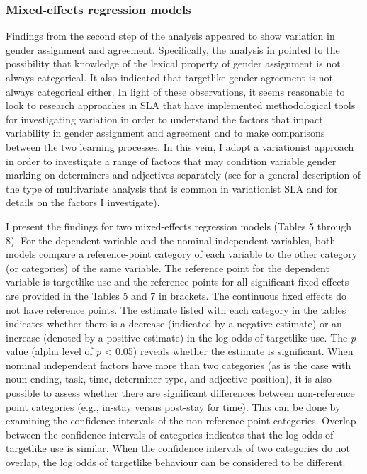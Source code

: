 \documentclass[output=paper,colorlinks,citecolor=brown,modfonts,nonflat]{../langscibook}
\begin{document}
\subsubsection{Mixed-effects regression models}\label{sec:gudmestad:3.2.3}

Findings from the second step of the analysis appeared to show variation in gender assignment and agreement. Specifically, the analysis in  pointed to the possibility that knowledge of the lexical property of gender assignment is not always categorical. It also indicated that targetlike gender agreement is not always categorical either. In light of these observations, it seems reasonable to look to research approaches in SLA that have implemented methodological tools for investigating variation in order to understand the factors that impact variability in gender assignment and agreement and to make comparisons between the two learning processes. In this vein, I adopt a variationist approach in order to investigate a range of factors that may condition variable gender marking on determiners and adjectives separately (see  for a general description of the type of multivariate analysis that is common in variationist SLA and for details on the factors I investigate). 



I present the findings for two mixed-effects regression models (Tables 5 through 8). For the dependent variable and the nominal independent variables, both models compare a reference-point category of each variable to the other category (or categories) of the same variable. The reference point for the dependent variable is targetlike use and the reference points for all significant fixed effects are provided in the Tables 5 and 7 in brackets. The continuous fixed effects do not have reference points. The estimate listed with each category in the tables indicates whether there is a decrease (indicated by a negative estimate) or an increase (denoted by a positive estimate) in the log odds of targetlike use. The \textit{p} value (alpha level of \textit{p} < 0.05) reveals whether the estimate is significant. When nominal independent factors have more than two categories (as is the case with noun ending, task, time, determiner type, and adjective position), it is also possible to assess whether there are significant differences between non-reference point categories (e.g., in-stay versus post-stay for time). This can be done by examining the confidence intervals of the non-reference point categories. Overlap between the confidence intervals of categories indicates that the log odds of targetlike use is similar. When the confidence intervals of two categories do not overlap, the log odds of targetlike behaviour can be considered to be different.
\end{document}
